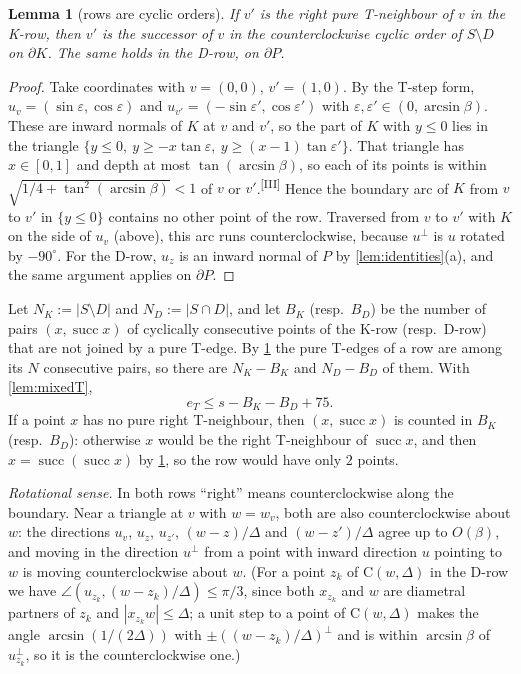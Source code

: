 \documentclass[11pt]{amsart}
\newtheorem{lemma}[theorem]{Lemma}
\theoremstyle{definition}
\theoremstyle{remark}
\newcommand{\eps}{\varepsilon}
\newcommand{\Cc}{\mathrm{C}}      %
\newcommand{\chk}[1]{\textsuperscript{[#1]}}
\begin{document}
\begin{lemma}[rows are cyclic orders]\label{lem:cyclic}
If $v'$ is the right pure T-neighbour of $v$ in the K-row, then $v'$ is the successor of $v$ in the counterclockwise cyclic order of $S\setminus D$ on $\partial K$. The same holds in the D-row, on $\partial P$.
\end{lemma}
\begin{proof}
Take coordinates with $v=(0,0)$, $v'=(1,0)$. By the T-step form, $u_v=(\sin\eps,\cos\eps)$ and $u_{v'}=(-\sin\eps',\cos\eps')$ with $\eps,\eps'\in(0,\arcsin\beta)$. These are inward normals of $K$ at $v$ and $v'$, so the part of $K$ with $y\le0$ lies in the triangle $\{y\le0,\ y\ge-x\tan\eps,\ y\ge(x-1)\tan\eps'\}$. That triangle has $x\in[0,1]$ and depth at most $\tan(\arcsin\beta)$, so each of its points is within $\sqrt{1/4+\tan^2(\arcsin\beta)}<1$ of $v$ or $v'$.\chk{III} Hence the boundary arc of $K$ from $v$ to $v'$ in $\{y\le0\}$ contains no other point of the row. Traversed from $v$ to $v'$ with $K$ on the side of $u_v$ (above), this arc runs counterclockwise, because $u^\perp$ is $u$ rotated by $-90^\circ$. For the D-row, $u_z$ is an inward normal of $P$ by \cref{lem:identities}(a), and the same argument applies on $\partial P$.
\end{proof}

Let $N_K:=|S\setminus D|$ and $N_D:=|S\cap D|$, and let $B_K$ (resp.\ $B_D$) be the number of pairs $(x,\operatorname{succ}x)$ of cyclically consecutive points of the K-row (resp.\ D-row) that are not joined by a pure T-edge. By \cref{lem:cyclic} the pure T-edges of a row are among its $N$ consecutive pairs, so there are $N_K-B_K$ and $N_D-B_D$ of them. With \cref{lem:mixedT},
\begin{equation}\label{eq:eTbreaks}
e_T\le s-B_K-B_D+75.
\end{equation}
If a point $x$ has no pure right T-neighbour, then $(x,\operatorname{succ}x)$ is counted in $B_K$ (resp.\ $B_D$): otherwise $x$ would be the right T-neighbour of $\operatorname{succ}x$, and then $x=\operatorname{succ}(\operatorname{succ}x)$ by \cref{lem:cyclic}, so the row would have only $2$ points.

\emph{Rotational sense.} In both rows ``right'' means counterclockwise along the boundary. Near a triangle at $v$ with $w=w_v$, both are also counterclockwise about $w$: the directions $u_v$, $u_z$, $u_{z'}$, $(w-z)/\Delta$ and $(w-z')/\Delta$ agree up to $O(\beta)$, and moving in the direction $u^\perp$ from a point with inward direction $u$ pointing to $w$ is moving counterclockwise about $w$. (For a point $z_k$ of $\Cc(w,\Delta)$ in the D-row we have $\angle(u_{z_k},(w-z_k)/\Delta)\le\pi/3$, since both $x_{z_k}$ and $w$ are diametral partners of $z_k$ and $|x_{z_k}w|\le\Delta$; a unit step to a point of $\Cc(w,\Delta)$ makes the angle $\arcsin(1/(2\Delta))$ with $\pm((w-z_k)/\Delta)^\perp$ and is within $\arcsin\beta$ of $u_{z_k}^\perp$, so it is the counterclockwise one.)
\end{document}

